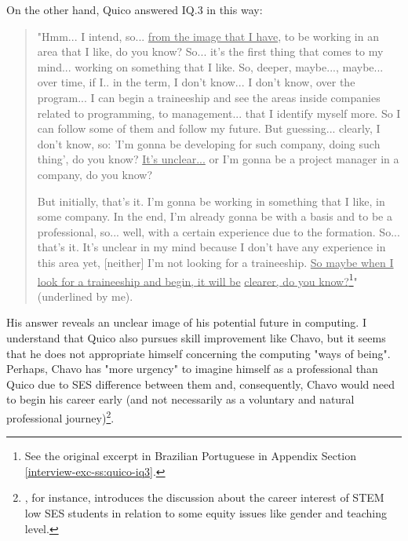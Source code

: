 On the other hand, Quico answered \gls{IQ}.3 in this way:
\begin{quote}
    "Hmm... I intend, so... \underline{from the image that I have}, to be working in an area that I like, do you know? So... it's the first thing that comes to my mind... working on something that I like. So, deeper, maybe..., maybe... over time, if I.. in the term, I don't know... I don't know, over the  program... I can begin a traineeship and see the areas inside companies related to programming, to management... that I identify myself more. So I can follow some of them and follow my future. But guessing... clearly, I don't know, so: 'I'm gonna be developing for such company, doing such thing', do you know? \underline{It's unclear...} or I'm gonna be a project manager in a company, do you know?

    But initially, that's it. I'm gonna be working in something that I like, in some company. In the end, I'm already gonna be with a basis and to be a professional, so... well, with a certain experience due to the formation. So... that’s it. It’s unclear in my mind because I don’t have any experience in this area yet, [neither] I’m not looking for a traineeship. \underline{So maybe when I look for a traineeship and begin, it will be} \underline{clearer, do you know?}\footnote{See the original excerpt in Brazilian Portuguese in Appendix Section \ref{interview-exc-ss:quico-iq3}.}" (underlined by me).
\end{quote}
His answer reveals an unclear image of his potential future in computing. I understand that Quico also pursues skill improvement like Chavo, but it seems that he does not appropriate himself concerning the computing "ways of being". Perhaps, Chavo has "more urgency" to imagine himself as a professional than Quico due to \gls{SES} difference between them and, consequently, Chavo would need to begin his career early (and not necessarily as a voluntary and natural professional journey)\footnote{, for instance, introduces the discussion about the career interest of \gls{STEM} low \gls{SES} students in
relation to some equity issues like gender and teaching level.}. 

